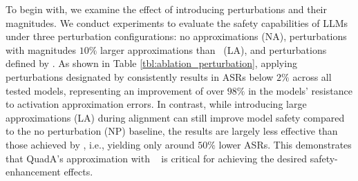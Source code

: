 To begin with, we examine the effect of introducing perturbations and their magnitudes. We conduct experiments to evaluate the safety capabilities of LLMs under three perturbation configurations: no approximations (NA), perturbations with magnitudes $10\%$ larger approximations than \mva~(LA), and perturbations defined by \mva. As shown in Table \ref{tbl:ablation_perturbation}, applying perturbations designated by \mva consistently results in ASRs below $2\%$ across all tested models, representing an improvement of over $98\%$ in the models' resistance to activation approximation errors. In contrast, while introducing large approximations (LA) during alignment can still improve model safety compared to the no perturbation (NP) baseline, the results are largely less effective than those achieved by \mva, i.e., yielding only around $50\%$ lower ASRs. This demonstrates that QuadA's approximation with \mva~ is critical for achieving the desired safety-enhancement effects.
